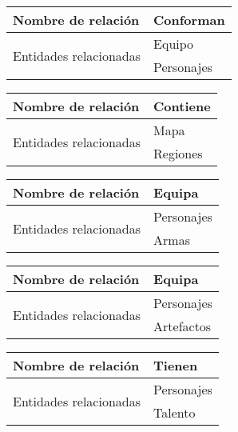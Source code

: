 \documentclass{report}
\begin{document}
\hfill

\begin{center}    
    \begin{tabular}{|p{3cm}|p{5cm}|}
    \hline
    Nombre de relación& Conforman\\ 
    \hline
    \hline
    \multirow{2}{6em}{Entidades relacionadas}& Equipo \\ &Personajes\\ 
    \hline
    \end{tabular}
\end{center}

\hfill

\begin{center}    
    \begin{tabular}{|p{3cm}|p{5cm}|}
    \hline
    Nombre de relación& Contiene\\ 
    \hline
    \hline
    \multirow{2}{6em}{Entidades relacionadas}& Mapa \\ &Regiones\\ 
    \hline
    \end{tabular}
\end{center}

\hfill

\begin{center}    
    \begin{tabular}{|p{3cm}|p{5cm}|}
    \hline
    Nombre de relación& Equipa\\ 
    \hline
    \hline
    \multirow{2}{6em}{Entidades relacionadas}& Personajes \\ &Armas\\ 
    \hline
    \end{tabular}
\end{center}

\hfill

\begin{center}    
    \begin{tabular}{|p{3cm}|p{5cm}|}
    \hline
    Nombre de relación& Equipa\\ 
    \hline
    \hline
    \multirow{2}{6em}{Entidades relacionadas}& Personajes \\ &Artefactos\\ 
    \hline
    \end{tabular}
\end{center}

\hfill

\begin{center}    
    \begin{tabular}{|p{3cm}|p{5cm}|}
    \hline
    Nombre de relación& Tienen\\ 
    \hline
    \hline
    \multirow{2}{6em}{Entidades relacionadas}& Personajes \\ &Talento\\ 
    \hline
    \end{tabular}
\end{center}
\end{document}
